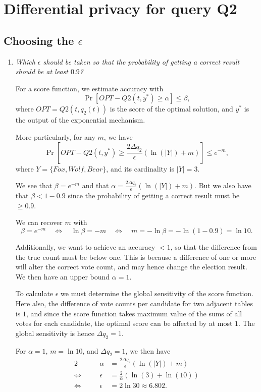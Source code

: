 \documentclass[parskip=half]{scrartcl}
\begin{document}
\section{Differential privacy for query Q2}

\subsection{Choosing the \texorpdfstring{$\epsilon$}{ε}}

\begin{enumerate}
    \item \textit{Which $\epsilon$ should be taken so that the probability of
    getting a correct result should be at least $0.9$?}

    For a score function, we estimate accuracy with
    $$
        \Pr[OPT - Q2(t, y^*) \ge \alpha] \le \beta,
    $$
    where $OPT=Q2(t, q_2(t))$ is the score of the optimal solution, and $y^*$ is
    the output of the exponential mechanism.
    
    More particularly, for any $m$, we have
    $$
        \Pr[OPT - Q2(t, y^*) \ge
        \frac{2\Delta q_2}{\epsilon}(\ln{(|Y|)} + m)] \le e^{-m},
    $$
    where $Y = \{Fox, Wolf, Bear\}$, and its cardinality is $|Y|=3$.

    We see that $\beta = e^{-m}$ and that $\alpha =
    \frac{2\Delta q_2}{\epsilon}(\ln{(|Y|)} + m)$. But we also have that
    $\beta < 1 - 0.9$ since the probability of getting a correct result must be
    $\ge 0.9$.

    We can recover $m$ with
    $$
        \beta = e^{-m} \quad\Leftrightarrow\quad
        \ln{\beta} = -m \quad\Leftrightarrow\quad
        m = -\ln{\beta} = -\ln{(1 - 0.9)}=\ln{10}.
    $$

    Additionally, we want to achieve an accuracy $<1$, so that the
    difference from the true count must be below one. This is because a
    difference of one or more will alter the correct vote count, and may hence
    change the election result. We then have an upper bound $\alpha=1$.

    To calculate $\epsilon$ we must determine the global sensitivity of the
    score function. Here also, the difference of vote counts per candidate
    for two adjacent tables is $1$, and since the score function takes maximum
    value of the sums of all votes for each candidate, the optimal score can
    be affected by at most $1$. The global sensitivity is hence
    $\Delta q_2 = 1$.

    For $\alpha = 1$, $m=\ln{10}$, and $\Delta q_2=1$, we then have
    \begin{alignat*}{2}
        \quad&& \alpha &= \frac{2\Delta q_2}{\epsilon}(\ln(|Y|) + m)\\
        \Leftrightarrow\quad&&
        \epsilon &= \frac{2}{\alpha}(\ln(3) + \ln(10))\\
        \Leftrightarrow\quad&&
        \epsilon &= 2 \ln{30} \approx 6.802.
    \end{alignat*}


\end{enumerate}
\end{document}
